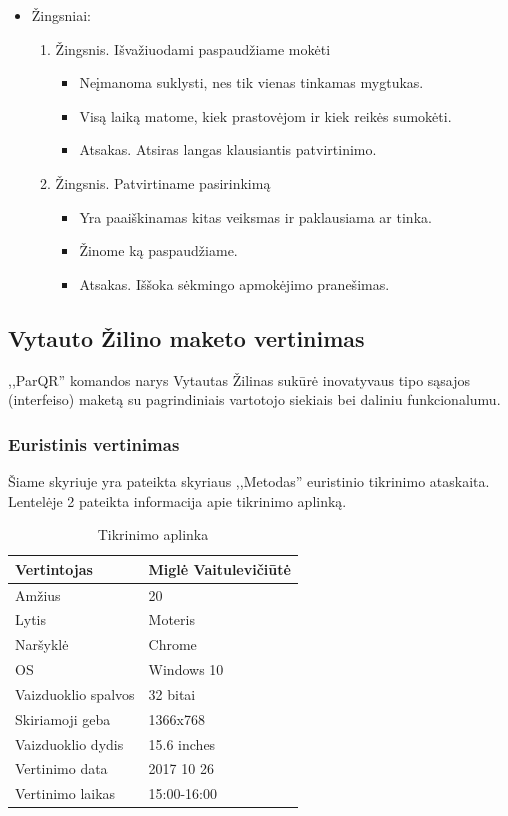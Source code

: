 \documentclass{VUMIFPSkursinis}
\begin{document}
\begin{itemize}
	\item Žingsniai:
		\begin{enumerate}
			\item Žingsnis. Išvažiuodami paspaudžiame mokėti
				\begin{itemize}
					\item Neįmanoma suklysti, nes tik vienas tinkamas mygtukas.
					\item Visą laiką matome, kiek prastovėjom ir kiek reikės sumokėti.
					\item Atsakas. Atsiras langas klausiantis patvirtinimo.
				\end{itemize}
			\item Žingsnis. Patvirtiname pasirinkimą
				\begin{itemize}
					\item Yra paaiškinamas kitas veiksmas ir paklausiama ar tinka.				
					\item Žinome ką paspaudžiame.				
					\item Atsakas. Iššoka sėkmingo apmokėjimo pranešimas. 
				\end{itemize}
		\end{enumerate}
\end{itemize}

\subsection{Vytauto Žilino maketo vertinimas}
,,ParQR'' komandos narys Vytautas Žilinas sukūrė inovatyvaus tipo sąsajos (interfeiso) maketą su pagrindiniais vartotojo siekiais bei daliniu funkcionalumu.

\subsubsection{Euristinis vertinimas}
Šiame skyriuje yra pateikta skyriaus ,,Metodas'' euristinio tikrinimo ataskaita.
Lentelėje 2 pateikta informacija apie tikrinimo aplinką.


\begin{table}[H]\footnotesize
  \centering
  \caption{Tikrinimo aplinka}
  {\begin{tabular}{|p{}|p{}|}
	\hline
	Vertintojas & Miglė Vaitulevičiūtė\\
	\hline
	Amžius & 20 \\
	\hline
	Lytis & Moteris \\
	\hline
	Naršyklė & Chrome \\
	\hline
	OS & Windows 10 \\
	\hline
	Vaizduoklio spalvos & 32 bitai \\
	\hline
	Skiriamoji geba & 1366x768 \\
	\hline
	Vaizduoklio dydis & 15.6 inches \\
	\hline
	Vertinimo data & 2017 10 26 \\
	\hline
	Vertinimo laikas & 15:00-16:00 \\
    \hline
  \end{tabular}}
  \label{tab:table example}
\end{table}
\end{document}
